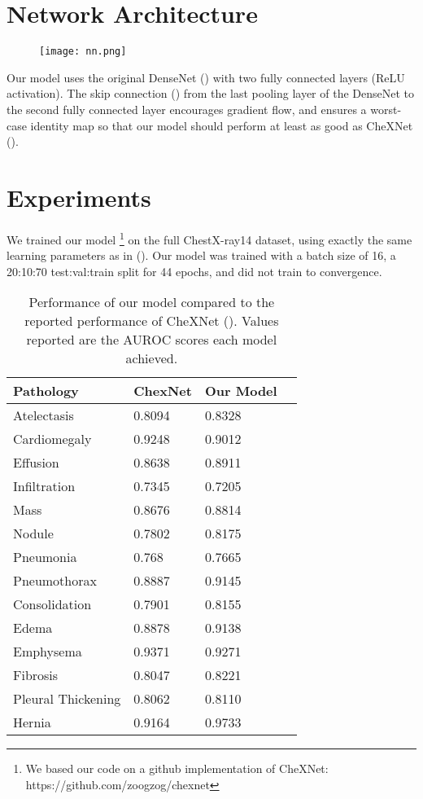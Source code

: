 \documentclass{article}
\begin{document}
\section{Network Architecture}
\label{Arch}
\begin{figure}[H]
  \centering
  \texttt{[image: nn.png]}
\end{figure}
Our model uses the original DenseNet (\citet{huang2017densely}) with two fully connected layers (ReLU activation). The skip connection (\citet{he2016deep}) from the last pooling layer of the DenseNet to the second fully connected layer encourages gradient flow, and ensures a worst-case identity map so that our model should perform at least as good as CheXNet (\citet{rajpurkar2017chexnet}).


\section{Experiments}
\label{Exp}

We trained our model \footnote{We based our code on a github implementation of CheXNet: https://github.com/zoogzog/chexnet} on the full ChestX-ray14 dataset, using exactly the same learning parameters as in (\citet{rajpurkar2017chexnet}). Our model was trained with a batch size of 16, a 20:10:70 test:val:train split for 44 epochs, and did not train to convergence.

\begin{table}[H]
  \caption{Performance of our model compared to the reported performance of CheXNet (\citet{rajpurkar2017chexnet}). Values reported are the AUROC scores each model achieved.}
  \label{Comparison of our work against CheXNet}
  \centering
  \begin{tabular}{llll}
    \toprule
        Pathology &	 ChexNet    & Our Model \\
    \midrule
    Atelectasis   &	0.8094 &	0.8328 \\
    Cardiomegaly   &  	0.9248 &	0.9012 \\
    Effusion     &	0.8638 &	0.8911 \\
    Infiltration &	0.7345 &	0.7205 \\
    Mass    &	0.8676 &	0.8814 \\
    Nodule  &	0.7802 &	0.8175 \\
    Pneumonia &	0.768	& 0.7665 \\ 
    Pneumothorax &	0.8887 &	0.9145\\ 
    Consolidation &	0.7901 &	0.8155\\ 
    Edema   &	0.8878	& 0.9138\\
    Emphysema & 	0.9371 &	0.9271 \\
    Fibrosis &	0.8047 &	0.8221 \\ 
    Pleural Thickening &	0.8062	& 0.8110 \\
    Hernia &	0.9164 &	0.9733\\
    \bottomrule
  \end{tabular}
\end{table}
\end{document}
